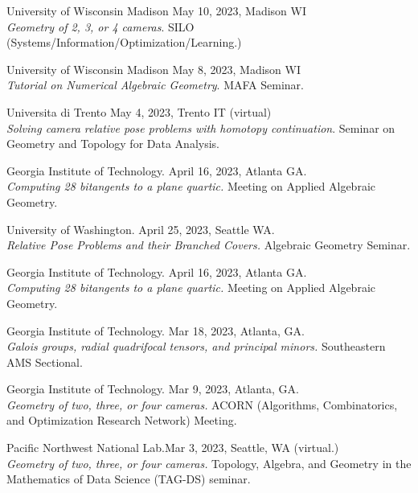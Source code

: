 \documentclass[margin,line,pifont,palatino,courier]{res}
\begin{document}
\begin{resume}
\par University of Wisconsin Madison \hfill May 10, 2023, Madison WI\\
\textit{Geometry of 2, 3, or 4 cameras}. SILO (Systems/Information/Optimization/Learning.)

\par University of Wisconsin Madison \hfill May 8, 2023, Madison WI\\
\textit{Tutorial on Numerical Algebraic Geometry}. MAFA Seminar.

\par Universita di Trento \hfill May 4, 2023, Trento IT (virtual)\\
\textit{Solving camera relative pose problems with homotopy continuation}. Seminar on Geometry and Topology for Data Analysis.

\par Georgia Institute of Technology. \hfill April 16, 2023, Atlanta GA.\\
\textit{Computing 28 bitangents to a plane quartic.} Meeting on Applied Algebraic Geometry.

\par University of Washington. \hfill April 25, 2023, Seattle WA.\\
\textit{Relative Pose Problems and their Branched Covers.} Algebraic Geometry Seminar.

\par Georgia Institute of Technology. \hfill April 16, 2023, Atlanta GA.\\
\textit{Computing 28 bitangents to a plane quartic.} Meeting on Applied Algebraic Geometry.

\par Georgia Institute of Technology. \hfill Mar 18, 2023, Atlanta, GA.\\
\textit{Galois groups, radial quadrifocal tensors, and principal minors.} Southeastern AMS Sectional.

\par Georgia Institute of Technology. \hfill Mar 9, 2023, Atlanta, GA.\\
\textit{Geometry of two, three, or four cameras.} ACORN (Algorithms, Combinatorics, and Optimization Research Network) Meeting.

\par Pacific Northwest National Lab.\hfill Mar 3, 2023, Seattle, WA (virtual.)\\
\textit{Geometry of two, three, or four cameras.} Topology, Algebra, and Geometry in the Mathematics of Data Science (TAG-DS) seminar.


\end{resume}
\end{document}
